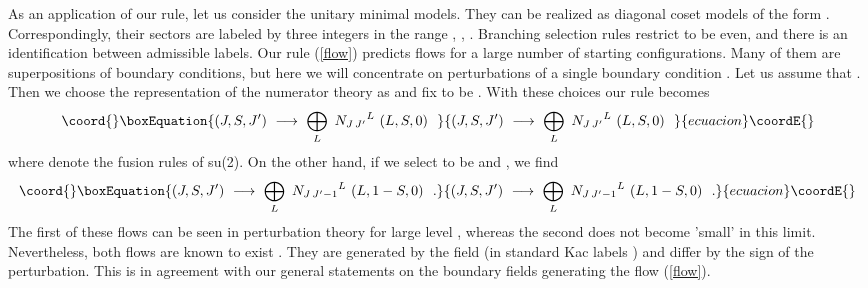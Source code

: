 \documentclass[a4paper,prd,twocolumn,nobibnotes,amssymb,preprintnumbers]{revtex4}
\begin{document}
As an application of our rule, let us consider the unitary minimal
models. They can be realized as diagonal coset models of the form 
\coordHE{}. 
Correspondingly, their sectors are labeled by three integers 
\coordHE{} in the range \coordHE{}, \coordHE{}, \coordHE{}. 
Branching selection rules restrict \coordHE{} to be even, and there 
is an identification  \coordHE{} between 
admissible labels. Our rule (\ref{flow}) predicts flows for a 
large number of starting configurations. Many of them are 
superpositions of boundary conditions, but here we will concentrate 
on perturbations of a single boundary condition \coordHE{}. Let us 
assume that \coordHE{}. Then we choose the representation
\myHighlight{$\sigma$}\coordHE{} of the numerator theory as \coordHE{} and fix \coordHE{} 
to be \coordHE{}. With these choices our rule becomes 
\begin{equation}\coord{}\boxEquation{\label{pertflow}
(J,S,J')\ \longrightarrow\ \bigoplus_{L}\ 
{N_{J\, J'}}^{L}\ (L,S,0)\ \ 
}{(J,S,J')\ \longrightarrow\ \bigoplus_{L}\ 
{N_{J\, J'}}^{L}\ (L,S,0)\ \ 
}{ecuacion}\coordE{}\end{equation}
where \myHighlight{$N$}\coordHE{} denote the fusion rules of su(2)\coordHE{}.
On the other hand, if we select \myHighlight{$\sigma $}\coordHE{} to be \coordHE{} and 
\myHighlight{$L' = (k+1)$}\coordHE{}, we find
\begin{equation}\coord{}\boxEquation{\label{nonpertflow}
(J,S,J')\ \longrightarrow\ \bigoplus_{L}\ 
{N_{J\,J'-1}}^{L}\ (L,1-S,0)\ \ .
}{(J,S,J')\ \longrightarrow\ \bigoplus_{L}\ 
{N_{J\,J'-1}}^{L}\ (L,1-S,0)\ \ .
}{ecuacion}\coordE{}\end{equation}
The first of these flows can be seen in perturbation theory for large
level \myHighlight{$k$}\coordHE{} \cite{Recknagel:2000ri,Graham:2001pp}, whereas the second 
does not become 'small' in this limit. Nevertheless, both flows are 
known to exist \cite{Chim:1996kf,Lesage:1998qf,Ahn:1998xm}. They 
are generated by the \coordHE{} field (in standard Kac labels \coordHE{}) 
and differ by the sign of the perturbation. This is in agreement with 
our general statements on the boundary fields generating the flow 
(\ref{flow}). 
\smallskip
\end{document}
